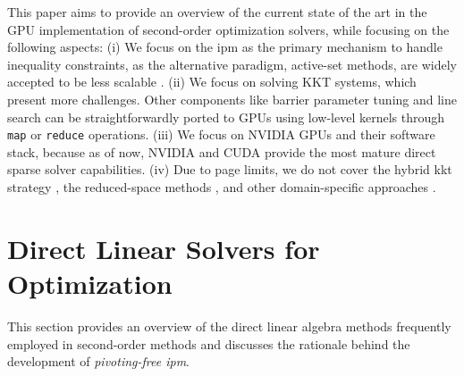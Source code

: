 \documentclass{article}
\begin{document}
This paper aims to provide an overview of the current state of the art in the GPU implementation of second-order optimization solvers, while focusing on the following aspects: (i) We focus on the \gls*{ipm} as the primary mechanism to handle inequality constraints, as the alternative paradigm, active-set methods, are widely accepted to be less scalable \cite{nocedalNumericalOptimization2006}. (ii) We focus on solving KKT systems, which present more challenges. Other components like barrier parameter tuning and line search can be straightforwardly ported to GPUs using low-level kernels through \texttt{map} or \texttt{reduce} operations. (iii) We focus on NVIDIA GPUs and their software stack, because as of now, NVIDIA and CUDA provide the most mature direct sparse solver capabilities. (iv) Due to page limits, we do not cover the hybrid \gls*{kkt} strategy \cite{regevHyKKTHybridDirectiterative2023}, the reduced-space methods \cite{pacaudAcceleratingCondensedInteriorPoint2023}, and other domain-specific approaches \cite{adabagMPCGPURealTimeNonlinear2024}.




\section{Direct Linear Solvers for Optimization}\label{eqn:linear}
This section provides an overview of the direct linear algebra methods frequently employed in second-order methods and discusses the rationale behind the development of \emph{pivoting-free \gls*{ipm}}.
\end{document}
